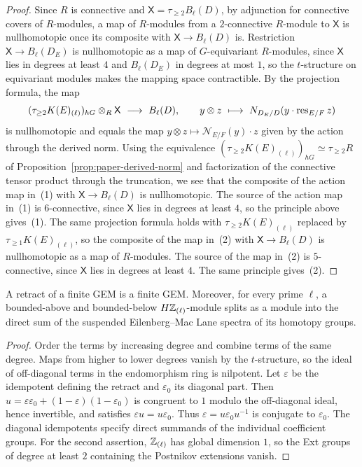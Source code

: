 \begin{proof}
Since $R$ is connective and $\mathsf X=\tau_{\ge2}B_\ell(D)$, by adjunction for connective covers of $R$-modules, a map of $R$-modules from a $2$-connective $R$-module to $\mathsf X$ is nullhomotopic once its composite with $\mathsf X\to B_\ell(D)$ is.
Restriction $\mathsf{X}\to B_\ell(D_E)$ is nullhomotopic as a map of $G$-equivariant $R$-modules, since $\mathsf{X}$ lies in degrees at least $4$ and $B_\ell(D_E)$ in degrees at most $1$, so the $t$-structure on equivariant modules makes the mapping space contractible.
By the projection formula, the map
\[
 (\tau_{\ge2}K(E)_{(\ell)})_{hG}\otimes_R \mathsf{X}\ \longrightarrow\ B_\ell(D),
 \qquad y\otimes z\ \longmapsto\
       N_{D_E/D}(y\cdot\operatorname{res}_{E/F}z)
\]
is nullhomotopic and equals the map $y\otimes z\mapsto\mathcal N_{E/F}(y)\cdot z$ given by the action through the derived norm.
Using the equivalence $(\tau_{\ge2}K(E)_{(\ell)})_{hG}\simeq\tau_{\ge2}R$ of Proposition~\ref{prop:paper-derived-norm} and factorization of the connective tensor product through the truncation, we see that the composite of the action map in~(1) with $\mathsf X\to B_\ell(D)$ is nullhomotopic.
The source of the action map in~(1) is $6$-connective, since $\mathsf X$ lies in degrees at least $4$, so the principle above gives~(1).
The same projection formula holds with $\tau_{\ge2}K(E)_{(\ell)}$ replaced by $\tau_{\ge1}K(E)_{(\ell)}$, so the composite of the map in~(2) with $\mathsf{X}\to B_\ell(D)$ is nullhomotopic as a map of $R$-modules.
The source of the map in~(2) is $5$-connective, since $\mathsf{X}$ lies in degrees at least $4$.
The same principle gives~(2).
\end{proof}

\begin{lemma}\label{lem:paper-gem-retract}
A retract of a finite GEM is a finite GEM.
Moreover, for every prime $\ell$, a bounded-above and bounded-below $H\mathbb Z_{(\ell)}$-module splits as a module into the direct sum of the suspended Eilenberg--Mac Lane spectra of its homotopy groups.
\end{lemma}
\begin{proof}
Order the terms by increasing degree and combine terms of the same degree.
Maps from higher to lower degrees vanish by the $t$-structure, so the ideal of off-diagonal terms in the endomorphism ring is nilpotent.
Let $\varepsilon$ be the idempotent defining the retract and $\varepsilon_0$ its diagonal part.
Then $u=\varepsilon\varepsilon_0+(1-\varepsilon)(1-\varepsilon_0)$ is congruent to $1$ modulo the off-diagonal ideal, hence invertible, and satisfies $\varepsilon u=u\varepsilon_0$.
Thus $\varepsilon=u\varepsilon_0u^{-1}$ is conjugate to $\varepsilon_0$.
The diagonal idempotents specify direct summands of the individual coefficient groups.
For the second assertion, $\mathbb Z_{(\ell)}$ has global dimension $1$, so the Ext groups of degree at least $2$ containing the Postnikov extensions vanish.
\end{proof}

